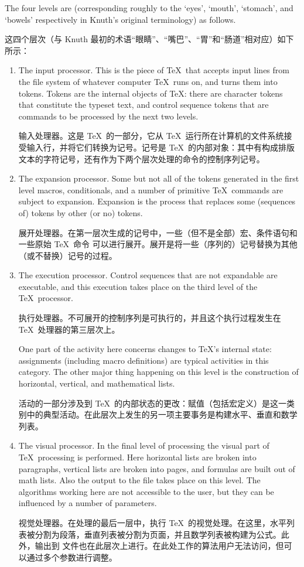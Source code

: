 The four levels are (corresponding roughly
to the `eyes', `mouth', `stomach', and `bowels' respectively
in Knuth's original terminology) as follows.

这四个层次（与 Knuth 最初的术语“眼睛”、“嘴巴”、“胃”和“肠道”相对应）如下所示：




\begin{enumerate}\item
The input processor. This is the piece of \TeX\ that
accepts input lines from the file system of whatever computer
\TeX\ runs on, and turns them into tokens.
Tokens are the internal objects of \TeX:
there are character tokens that constitute the typeset
text, and control sequence tokens that are commands 
to be processed by the next two levels.

输入处理器。这是 \TeX\ 的一部分，它从 \TeX\ 运行所在计算机的文件系统接受输入行，并将它们转换为记号。记号是 \TeX\ 的内部对象：其中有构成排版文本的字符记号，还有作为下两个层次处理的命令的控制序列记号。
\item The expansion processor. 
Some but not all of the tokens generated in the first level
\ldash macros, conditionals, and a number
of primitive \TeX\ commands \rdash  are subject to expansion.
Expansion is the process that replaces some (sequences of)
tokens by other (or no) tokens.

展开处理器。在第一层次生成的记号中，一些（但不是全部）\ldash 宏、条件语句和一些原始 \TeX\ 命令 \rdash 可以进行展开。展开是将一些（序列的）记号替换为其他（或不替换）记号的过程。
\item The execution processor. 
Control sequences that are not expandable are executable,
and this execution takes place on the third level of the
\TeX\ processor.

执行处理器。不可展开的控制序列是可执行的，并且这个执行过程发生在 \TeX\ 处理器的第三层次上。


One part of the activity here concerns changes to
\TeX's internal state: assignments (including
macro definitions) are typical activities in this
\awp
category. The other major thing happening on this level
is the construction of horizontal, vertical, and
mathematical lists.

活动的一部分涉及到 \TeX\ 的内部状态的更改：赋值（包括宏定义）是这一类别中的典型活动。在此层次上发生的另一项主要事务是构建水平、垂直和数学列表。
\item The visual processor. 
In the final level of processing
the visual part of \TeX\ processing is performed. Here
horizontal lists are broken into paragraphs, 
vertical lists are broken into pages,
and  formulas are built out of math lists. 
Also the output to the  file takes place on this level.
The algorithms working here are not accessible to the user,
but they can be influenced by a number of parameters.

视觉处理器。在处理的最后一层中，执行 \TeX\ 的视觉处理。在这里，水平列表被分割为段落，垂直列表被分割为页面，并且数学列表被构建为公式。此外，输出到  文件也在此层次上进行。在此处工作的算法用户无法访问，但可以通过多个参数进行调整。
\end{enumerate}




